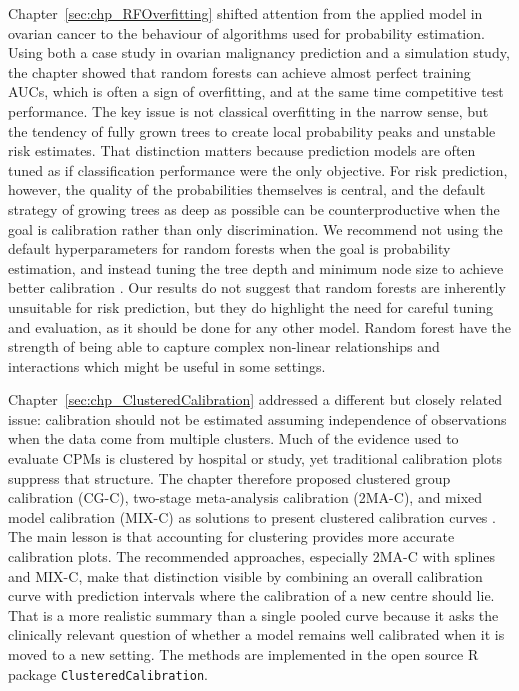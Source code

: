 Chapter~\ref{sec:chp_RFOverfitting} shifted attention from the applied model in ovarian cancer to the behaviour of algorithms used for probability estimation. Using both a case study in ovarian malignancy prediction and a simulation study, the chapter showed that random forests can achieve almost perfect training \gls{AUC}s, which is often a sign of overfitting, and at the same time competitive test performance. The key issue is not classical overfitting in the narrow sense, but the tendency of fully grown trees to create local probability peaks and unstable risk estimates. That distinction matters because prediction models are often tuned as if classification performance were the only objective. For risk prediction, however, the quality of the probabilities themselves is central, and the default strategy of growing trees as deep as possible can be counterproductive when the goal is calibration rather than only discrimination. We recommend not using the default hyperparameters for random forests when the goal is probability estimation, and instead tuning the tree depth and minimum node size to achieve better calibration \cite{barrenadaUnderstandingOverfittingRandom2024}. Our results do not suggest that random forests are inherently unsuitable for risk prediction, but they do highlight the need for careful tuning and evaluation, as it should be done for any other model. Random forest have the strength of being able to capture complex non-linear relationships and interactions which might be useful in some settings. 

Chapter~\ref{sec:chp_ClusteredCalibration} addressed a different but closely related issue: calibration should not be estimated assuming independence of observations  when the data come from multiple clusters. Much of the evidence used to evaluate \glspl{CPM} is clustered by hospital or study, yet traditional calibration plots suppress that structure. The chapter therefore proposed clustered group calibration (CG-C), two-stage meta-analysis calibration (2MA-C), and mixed model calibration (MIX-C) as solutions to present clustered calibration curves \cite{barrenadaClusteredFlexibleCalibration2026}. The main lesson is that accounting for clustering provides more accurate calibration plots. The recommended approaches, especially 2MA-C with splines and MIX-C, make that distinction visible by combining an overall calibration curve with prediction intervals where the calibration of a new centre should lie. That is a more realistic summary than a single pooled curve because it asks the clinically relevant question of whether a model remains well calibrated when it is moved to a new setting. The methods are implemented in the open source R package \texttt{ClusteredCalibration}.

